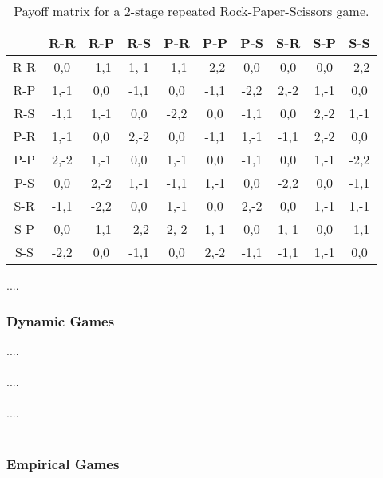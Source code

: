 \begin{flushleft}
    \begin{table}[t] 
        \centering 
        \caption{Payoff matrix for a 2-stage repeated Rock-Paper-Scissors game.}
        \vspace{0.6em}
        \label{tab:rps_2stage_payoff} 
        \begin{tabular}{c|c c c c c c c c c} 
                & R-R  & R-P  & R-S  & P-R  & P-P  & P-S  & S-R  & S-P  & S-S \\ \hline
            R-R & 0,0  & -1,1 & 1,-1 & -1,1 & -2,2 & 0,0  & 0,0  & 0,0  & -2,2 \\
            R-P & 1,-1 & 0,0  & -1,1 & 0,0  & -1,1 & -2,2 & 2,-2 & 1,-1 & 0,0 \\
            R-S & -1,1 & 1,-1 & 0,0  & -2,2 & 0,0  & -1,1 & 0,0  & 2,-2 & 1,-1 \\
            P-R & 1,-1 & 0,0  & 2,-2 & 0,0  & -1,1 & 1,-1 & -1,1 & 2,-2 & 0,0 \\
            P-P & 2,-2 & 1,-1 & 0,0  & 1,-1 & 0,0  & -1,1 & 0,0  & 1,-1 & -2,2 \\
            P-S & 0,0  & 2,-2 & 1,-1 & -1,1 & 1,-1 & 0,0  & -2,2 & 0,0  & -1,1 \\
            S-R & -1,1 & -2,2 & 0,0  & 1,-1 & 0,0  & 2,-2 & 0,0  & 1,-1 & 1,-1 \\
            S-P & 0,0  & -1,1 & -2,2 & 2,-2 & 1,-1 & 0,0  & 1,-1 & 0,0  & -1,1 \\
            S-S & -2,2 & 0,0  & -1,1 & 0,0  & 2,-2 & -1,1 & -1,1 & 1,-1 & 0,0 \\
    \end{tabular} 
\end{table}
    
\end{flushleft}

\begin{flushleft}
    ....
\end{flushleft}

\subsubsection{Dynamic Games}

\begin{flushleft}
    ....\\~\\

    ....\\~\\
    
    ....\\~\\
\end{flushleft}

\subsubsection{Empirical Games}